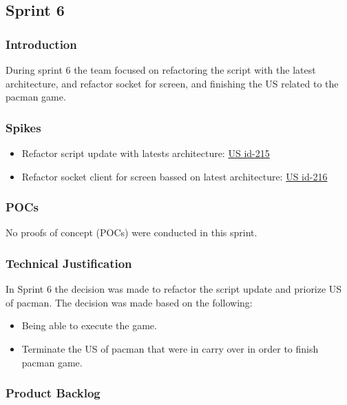 \subsection{Sprint 6}

\subsubsection{Introduction}
During sprint 6 the team focused on refactoring the script with the latest architecture, and refactor socket for screen, and finishing the US related to the pacman game. 

\subsubsection{Spikes}

\begin{itemize}
    \item Refactor script update with latests architecture: \href{https://tree.taiga.io/project/joseluis-teran-coffeetime/us/215?milestone=396824}{US id-215}
    \item Refactor socket client for screen bassed on latest architecture: \href{https://tree.taiga.io/project/joseluis-teran-coffeetime/us/216?milestone=397461}{US id-216}
\end{itemize}

\subsubsection{POCs}

No proofs of concept (POCs) were conducted in this sprint.

\subsubsection{Technical Justification}
In Sprint 6 the decision was made to refactor the script update and priorize US of pacman. The decision was made based on the following:

\begin{itemize}
    \item  Being able to execute the game. 
    \item  Terminate the US of pacman that were in carry over in order to finish pacman game.
\end{itemize}

\newpage

\subsubsection{Product Backlog}

